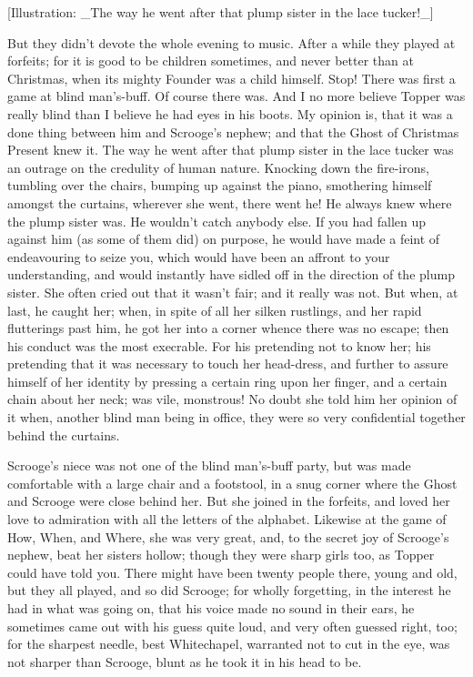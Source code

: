 [Illustration: _The way he went after that plump sister in the lace
tucker!_]

But they didn't devote the whole evening to music. After a while they
played at forfeits; for it is good to be children sometimes, and never
better than at Christmas, when its mighty Founder was a child himself.
Stop! There was first a game at blind man's-buff. Of course there was.
And I no more believe Topper was really blind than I believe he had eyes
in his boots. My opinion is, that it was a done thing between him and
Scrooge's nephew; and that the Ghost of Christmas Present knew it. The
way he went after that plump sister in the lace tucker was an outrage on
the credulity of human nature. Knocking down the fire-irons, tumbling
over the chairs, bumping up against the piano, smothering himself
amongst the curtains, wherever she went, there went he! He always knew
where the plump sister was. He wouldn't catch anybody else. If you had
fallen up against him (as some of them did) on purpose, he would have
made a feint of endeavouring to seize you, which would have been an
affront to your understanding, and would instantly have sidled off in
the direction of the plump sister. She often cried out that it wasn't
fair; and it really was not. But when, at last, he caught her; when, in
spite of all her silken rustlings, and her rapid flutterings past him,
he got her into a corner whence there was no escape; then his conduct
was the most execrable. For his pretending not to know her; his
pretending that it was necessary to touch her head-dress, and further to
assure himself of her identity by pressing a certain ring upon her
finger, and a certain chain about her neck; was vile, monstrous! No
doubt she told him her opinion of it when, another blind man being in
office, they were so very confidential together behind the curtains.

Scrooge's niece was not one of the blind man's-buff party, but was made
comfortable with a large chair and a footstool, in a snug corner where
the Ghost and Scrooge were close behind her. But she joined in the
forfeits, and loved her love to admiration with all the letters of the
alphabet. Likewise at the game of How, When, and Where, she was very
great, and, to the secret joy of Scrooge's nephew, beat her sisters
hollow; though they were sharp girls too, as Topper could have told you.
There might have been twenty people there, young and old, but they all
played, and so did Scrooge; for wholly forgetting, in the interest he
had in what was going on, that his voice made no sound in their ears, he
sometimes came out with his guess quite loud, and very often guessed
right, too; for the sharpest needle, best Whitechapel, warranted not to
cut in the eye, was not sharper than Scrooge, blunt as he took it in
his head to be.

